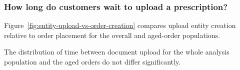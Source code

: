 \subsubsection{How long do customers wait to upload a prescription?}
\label{subsec:entity-upload-analysis-upload}
Figure~\ref{fig:entity-upload-vs-order-creation} compares upload entity
creation relative to order placement for the overall and aged-order populations.

The distribution of time between document upload for the whole
analysis population and the aged orders do not differ significantly.



